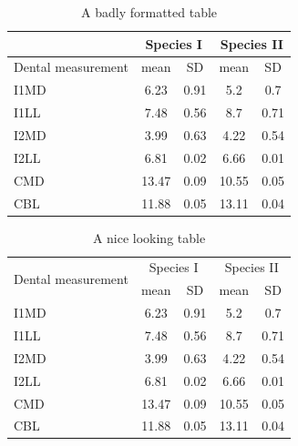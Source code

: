 \begin{table}
	\caption{A badly formatted table}
	\centering
	\label{table:bad_table}
	\begin{tabular}{|l|c|c|c|c|}
		\hline 
		& \multicolumn{2}{c}{Species I} & \multicolumn{2}{c|}{Species II} \\ 
		\hline
		Dental measurement  & mean & SD  & mean & SD  \\ \hline 
		\hline
		I1MD & 6.23 & 0.91 & 5.2  & 0.7  \\
		\hline 
		I1LL & 7.48 & 0.56 & 8.7  & 0.71 \\
		\hline 
		I2MD & 3.99 & 0.63 & 4.22 & 0.54 \\
		\hline 
		I2LL & 6.81 & 0.02 & 6.66 & 0.01 \\
		\hline 
		CMD & 13.47 & 0.09 & 10.55 & 0.05 \\
		\hline 
		CBL & 11.88 & 0.05 & 13.11 & 0.04\\ 
		\hline 
	\end{tabular}
\end{table}

\begin{table}
	\caption{A nice looking table}
	\centering
	\label{table:nice_table}
	\begin{tabular}{l c c c c}
		\hline 
		\multirow{2}{*}{Dental measurement} & \multicolumn{2}{c}{Species I} & \multicolumn{2}{c}{Species II} \\ 
		\cline{2-5}
		& mean & SD  & mean & SD  \\ 
		\hline
		I1MD & 6.23 & 0.91 & 5.2  & 0.7  \\
		
		I1LL & 7.48 & 0.56 & 8.7  & 0.71 \\
		
		I2MD & 3.99 & 0.63 & 4.22 & 0.54 \\
		
		I2LL & 6.81 & 0.02 & 6.66 & 0.01 \\
		
		CMD & 13.47 & 0.09 & 10.55 & 0.05 \\
		
		CBL & 11.88 & 0.05 & 13.11 & 0.04\\ 
		\hline 
	\end{tabular}
\end{table}


